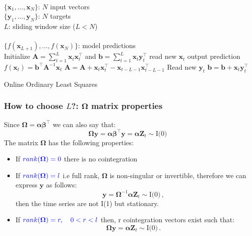 \documentclass{beamer}
\begin{document}
\begin{frame}
\begin{algorithm}[H]
\begin{algorithmic}[1]
\REQUIRE $\,$ \\
$\{\mathbf{x}_1,\dots,\mathbf{x}_N \}$: $N$ input vectors \\
$\{\mathbf{y}_1,\dots,\mathbf{y}_N \}$: $N$ targets \\
$L$: sliding window size ($L<N$) \\
\ENSURE  $\,$ \\
$\{f(\mathbf{x}_{L+1}),\dots,f(\mathbf{x}_N) \}$: model predictions \\
\STATE Initialize $\mathbf{A}=\displaystyle \sum_{t=1}^L \mathbf{x}_t
\mathbf{x}_t^\intercal$
and $\mathbf{b}=\displaystyle \sum_{t=1}^L \mathbf{x}_t \mathbf{y}^\intercal_{t}$
        \STATE read new $\mathbf{x}_t$
        \STATE output prediction $f(\mathbf{x}_t) =  \mathbf{b}^\intercal
\mathbf{A}^{-1}\mathbf{x}_t$
\STATE $\mathbf{A} = \mathbf{A} + \mathbf{x}_t \mathbf{x}_t^\intercal-
\mathbf{x}_{t-L-1} \mathbf{x}_{t-L-1}^\intercal  $
        \STATE Read new $\mathbf{y}_t$
        \STATE $\mathbf{b} = \mathbf{b} + \mathbf{x}_t \mathbf{y}^\intercal_{t}$
\ENDFOR
\end{algorithmic}
\caption{Online Ordinary Least Squares}
\label{alg:SLAAR}
\end{algorithm}
\end{frame}

\begin{frame}
\frametitle{How to choose $L$?: $\boldsymbol \Omega$ matrix properties}
Since $\boldsymbol \Omega = \boldsymbol \alpha \boldsymbol \beta^\intercal$ we can also say that:
$$\boldsymbol \Omega \mathbf{y} = \boldsymbol \alpha \boldsymbol \beta^\intercal \mathbf{y} = \boldsymbol \alpha \mathbf{Z}_t \sim \text{I(0)}$$
The matrix $\boldsymbol \Omega$ has the following properties:
\begin{itemize}
\item If ${\color{blue}rank(\boldsymbol \Omega) = 0}$ there is no cointegration
\item If ${\color{blue}rank(\boldsymbol\Omega)=l}$ i.e full rank, $\boldsymbol\Omega$ is non-singular or invertible, therefore we can express $\mathbf{y}$ as follows:
$$\mathbf{y} = \boldsymbol \Omega ^{-1} \boldsymbol \alpha \mathbf{Z}_t \sim \text{I(0)} \, ,$$
then the time series are not I(1) but stationary.
\item If ${\color{blue}rank(\boldsymbol\Omega)=r,\quad 0 < r < l}$ then, r cointegration vectors exist such that: 
$$\boldsymbol \Omega \mathbf{y} = \boldsymbol \alpha \mathbf{Z}_t \sim \text{I(0)} \, .$$
\end{itemize}
\end{frame}
\end{document}
